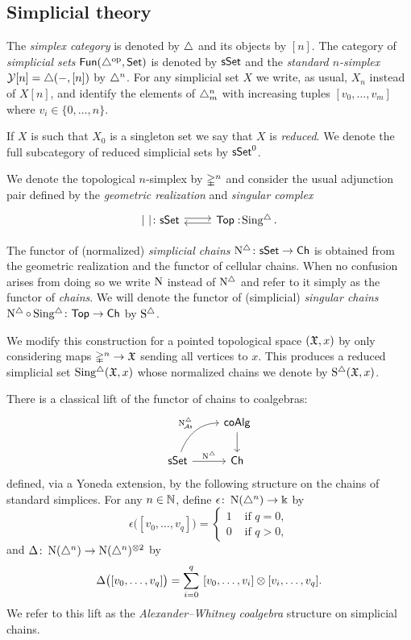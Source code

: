 \subsection{Simplicial theory}\label{ss:simplicial}

The \textit{simplex category} is denoted by $\triangle$ and its objects by $[n]$.
The category of \textit{simplicial sets} $\mathsf{Fun}(\triangle^{\mathrm{op}}, \mathsf{Set})$ is denoted by $\mathsf{sSet}$ and the \textit{standard $n$-simplex} $\operatorname{\mathcal{Y}} [n] = \triangle(-, [n])$ by $\triangle^n$.
For any simplicial set $X$ we write, as usual, $X_n$ instead of $X[n]$, and identify the elements of $\triangle^n_m$ with increasing tuples $[v_0, \dots, v_m]$ where $v_i \in \{0, \dots, n\}$.

If $X$ is such that $X_0$ is a singleton set we say that $X$ is \textit{reduced}.
We denote the full subcategory of reduced simplicial sets by $\mathsf{sSet}^0$.

We denote the topological $n$-simplex by $\mathbb{\Delta}^{n}$ and consider the usual adjunction pair defined by the \textit{geometric realization} and \textit{singular complex}
\[
\begin{tikzcd}
	\bars{\ } \colon \sSet  \arrow[r, shift left=.5ex] &
	\Top :\! \sSing. \arrow[l, shift left=.5ex]
\end{tikzcd}
\]

The functor of (normalized) \textit{simplicial chains} $\operatorname{N^{\triangle}} \colon \mathsf{sSet} \to \mathsf{Ch}$ is obtained from the geometric realization and the functor of cellular chains.
When no confusion arises from doing so we write $\operatorname{N}$ instead of $\operatorname{N^{\triangle}}$ and refer to it simply as the functor of \textit{chains}.
We will denote the functor of (simplicial) \textit{singular chains} $\operatorname{N^{\triangle}} \circ \operatorname{Sing^{\triangle}} \colon \mathsf{Top} \to \mathsf{Ch}$ by $\operatorname{S^{\triangle}}$.

We modify this construction for a pointed topological space $(\mathfrak{X},x)$ by only considering maps $\mathbb{\Delta}^n \to \mathfrak{X}$ sending all vertices to $x$.
This produces a reduced simplicial set $\operatorname{Sing^{\triangle}}(\mathfrak{X},x)$ whose normalized chains we denote by $\operatorname{S^{\triangle}}(\mathfrak{X},x)$.

There is a classical lift of the functor of chains to coalgebras:
\[
\begin{tikzcd}
	& \coAlg \arrow[d] \\
	\sSet \arrow[r, "\schains"] \arrow[ur, "\schainsA", out=70, in=180] & \Ch
\end{tikzcd}
\]
defined, via a Yoneda extension, by the following structure on the chains of standard simplices.
For any $n \in \mathbb{N}$, define $\epsilon \colon \operatorname{N}(\triangle^n) \to \Bbbk$ by
\[
\epsilon \big( [v_0, \dots, v_q] \big) = \begin{cases} 1 & \text{ if } q = 0, \\ 0 & \text{ if } q>0, \end{cases}
\]
and $\Delta \colon \operatorname{N}(\triangle^n) \to \operatorname{N}(\triangle^n)^{\otimes2}$ by
\[
\Delta \big( [v_0, \dots, v_q] \big) = \sum_{i=0}^q \ [v_0, \dots, v_i] \otimes [v_i, \dots, v_q].
\]
We refer to this lift as the \textit{Alexander--Whitney coalgebra} structure on simplicial chains.

